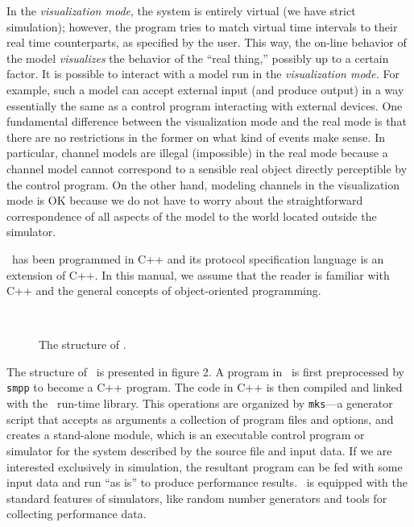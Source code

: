 In the {\em visualization mode}, the system is entirely virtual
(we have strict simulation); however, the program tries to match virtual
time intervals to their real time counterparts, as specified by the user.
This way, the on-line behavior of the model {\em visualizes\/} the
behavior of the ``real thing,'' possibly up to a certain factor.
It is possible to interact with a model run in the {\em visualization mode.}
For example, such a model can accept external input (and produce output)
in a way essentially the same as a control program interacting with external
devices.
One fundamental difference between the visualization mode and
the real mode is that there are no restrictions in the former on what kind of
events make sense.
In particular, channel models are illegal (impossible) in the real mode because
a channel model cannot correspond to a sensible
real object directly perceptible by the control program.
On the other hand, modeling channels in the visualization mode is OK because
we do not have to worry about the straightforward
correspondence of all aspects of the model to the world located outside
the simulator.

\smurph\ has been programmed in C++ and its protocol specification language
is an extension of C++.
In this manual, we assume that the reader is familiar with C++
and the general concepts of object-oriented programming.

\begin{figure}[htbp]%
\begin{center}
\ 
\caption{The structure of \smurph.}%
\end{center}
\end{figure}%

The structure of \smurph\ is presented in
figure 2.
A program in \smurph\ is first preprocessed by {\tt smpp}
to become a C++ program.
The code in C++ is then compiled and linked with the \smurph\ run-time
library.
This operations are organized by
{\tt mks}---a generator script
that accepts as arguments a collection of program files and options, and
creates a stand-alone module,
which is an executable control program or simulator
for the system described by the source file and input data.
If we are interested exclusively in simulation, the resultant program can
be fed with some input data and run ``as is'' to produce performance results.
\smurph\ is equipped with the standard features of simulators, like
random number generators and tools for collecting performance data.

